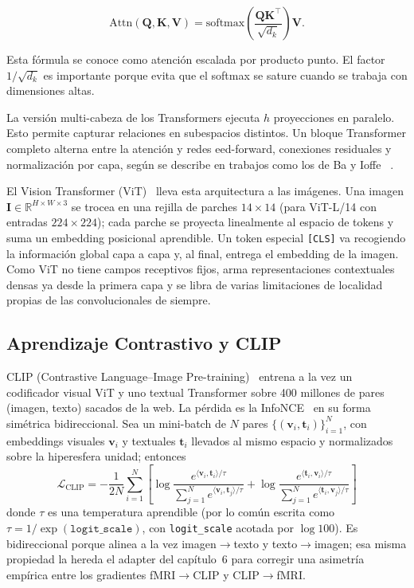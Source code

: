 \begin{equation}
\text{Attn}(\mathbf{Q},\mathbf{K},\mathbf{V}) = \text{softmax}\!\left(\frac{\mathbf{Q}\mathbf{K}^\top}{\sqrt{d_k}}\right)\mathbf{V}.
\end{equation}

Esta fórmula se conoce como atención escalada por producto punto. El factor $1/\sqrt{d_k}$ es importante 
porque evita que el softmax se sature cuando se trabaja con dimensiones altas.

La versión multi-cabeza de los Transformers ejecuta $h$ proyecciones en paralelo. Esto permite capturar 
relaciones en subespacios distintos. Un bloque Transformer completo alterna entre la atención y redes 
eed-forward, conexiones residuales y normalización por capa, según se describe en trabajos como los de 
Ba y Ioffe ~\cite{ba2016layernorm,ioffe2015batchnorm}.


El Vision Transformer (ViT)~\cite{dosovitskiy2021image} lleva esta arquitectura a las imágenes. 
Una imagen $\mathbf{I}\in\mathbb{R}^{H\times W\times 3}$ se trocea en una rejilla de parches 
$14\!\times\!14$ (para ViT-L/14 con entradas $224\!\times\!224$); cada parche se proyecta 
linealmente al espacio de tokens y suma un embedding posicional aprendible. Un token especial 
\texttt{[CLS]} va recogiendo la información global capa a capa y, al final, entrega el embedding 
de la imagen. Como ViT no tiene campos receptivos fijos, arma representaciones contextuales 
densas ya desde la primera capa y se libra de varias limitaciones de localidad propias de las 
convolucionales de siempre.

\subsection{Aprendizaje Contrastivo y CLIP}

CLIP (Contrastive Language--Image Pre-training)~\cite{radford2021learning} entrena a la vez un 
codificador visual ViT y uno textual Transformer sobre 400 millones de pares (imagen, texto) 
sacados de la web. La pérdida es la InfoNCE~\cite{vandenoord2018representation} en su forma 
simétrica bidireccional. Sea un mini-batch de $N$ pares $\{(\mathbf{v}_i,\mathbf{t}_i)\}_{i=1}^{N}$, 
con embeddings visuales $\mathbf{v}_i$ y textuales $\mathbf{t}_i$ llevados al mismo espacio y 
normalizados sobre la hiperesfera unidad; entonces
\begin{equation}
\mathcal{L}_{\text{CLIP}} = -\frac{1}{2N}\sum_{i=1}^{N}\left[\log\frac{e^{\langle\mathbf{v}_i,\mathbf{t}_i\rangle/\tau}}{\sum_{j=1}^{N} e^{\langle\mathbf{v}_i,\mathbf{t}_j\rangle/\tau}} + \log\frac{e^{\langle\mathbf{t}_i,\mathbf{v}_i\rangle/\tau}}{\sum_{j=1}^{N} e^{\langle\mathbf{t}_i,\mathbf{v}_j\rangle/\tau}}\right]
\end{equation}
donde $\tau$ es una temperatura aprendible (por lo común escrita como $\tau = 1/\exp(\texttt{logit\_scale})$, 
con \texttt{logit\_scale} acotada por $\log 100$). Es bidireccional porque alinea a la vez 
imagen$\rightarrow$texto y texto$\rightarrow$imagen; esa misma propiedad la hereda el adapter 
del capítulo~6 para corregir una asimetría empírica entre los gradientes fMRI$\rightarrow$CLIP 
y CLIP$\rightarrow$fMRI.

